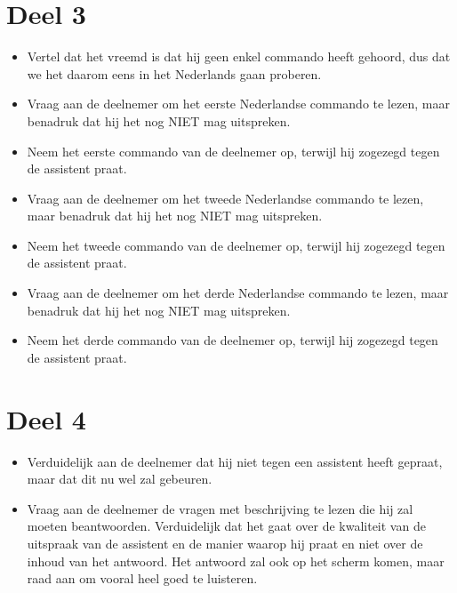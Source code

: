 \section{Deel 3}
\begin{itemize}
    \item Vertel dat het vreemd is dat hij geen enkel commando heeft gehoord, dus dat we het daarom eens in het Nederlands gaan proberen.
    \item Vraag aan de deelnemer om het eerste Nederlandse commando te lezen, maar benadruk dat hij het nog NIET mag uitspreken.
    \item Neem het eerste commando van de deelnemer op, terwijl hij zogezegd tegen de assistent praat.
    \item Vraag aan de deelnemer om het tweede Nederlandse commando te lezen, maar benadruk dat hij het nog NIET mag uitspreken.
    \item Neem het tweede commando van de deelnemer op, terwijl hij zogezegd tegen de assistent praat.
    \item Vraag aan de deelnemer om het derde Nederlandse commando te lezen, maar benadruk dat hij het nog NIET mag uitspreken.
    \item Neem het derde commando van de deelnemer op, terwijl hij zogezegd tegen de assistent praat.
\end{itemize}

\section{Deel 4}
\begin{itemize}
    \item Verduidelijk aan de deelnemer dat hij niet tegen een assistent heeft gepraat, maar dat dit nu wel zal gebeuren.
    \item Vraag aan de deelnemer de vragen met beschrijving te lezen die hij zal moeten beantwoorden. Verduidelijk dat het gaat over de kwaliteit van de uitspraak van de assistent en de manier waarop hij praat en niet over de inhoud van het antwoord. Het antwoord zal ook op het scherm komen, maar raad aan om vooral heel goed te luisteren.
\end{itemize}

